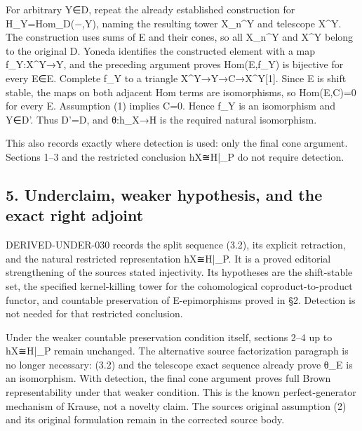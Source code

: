 For arbitrary Y\allowbreak{}∈D,\allowbreak{} repeat the already established construction for H\_\allowbreak{}Y\allowbreak{}=Hom\_\allowbreak{}D(−,\allowbreak{}Y)\allowbreak{},\allowbreak{} naming the resulting tower X\_\allowbreak{}n\textasciicircum{}Y and telescope X\^{}Y. The construction uses sums of E and their cones,\allowbreak{} so all X\_\allowbreak{}n\textasciicircum{}Y and X\^{}Y belong to the original D\textquotesingle. Yoneda identifies the constructed element with a map f\_\allowbreak{}Y:\allowbreak{}X\textasciicircum{}Y\allowbreak{}→Y,\allowbreak{} and the preceding argument proves Hom(E,\allowbreak{}f\_\allowbreak{}Y)\allowbreak{} is bijective for every E\allowbreak{}∈E. Complete f\_\allowbreak{}Y to a triangle X\textasciicircum{}Y\allowbreak{}→Y\allowbreak{}→C\allowbreak{}→X\textasciicircum{}Y[1]\allowbreak{}. Since E is shift stable,\allowbreak{} the maps on both adjacent Hom terms are isomorphisms,\allowbreak{} so Hom(E,\allowbreak{}C)\allowbreak{}\allowbreak{}=0 for every E. Assumption (1)\allowbreak{} implies C\allowbreak{}=0. Hence f\_\allowbreak{}Y is an isomorphism and Y\allowbreak{}∈D'. Thus D'\allowbreak{}=D,\allowbreak{} and θ:\allowbreak{}h\_\allowbreak{}X\allowbreak{}→H is the required natural isomorphism.

This also records exactly where detection is used:\allowbreak{} only the final cone argument. Sections 1–\allowbreak{}3 and the restricted conclusion hX≅H|\_\allowbreak{}P do not require detection.

\subsection{\texorpdfstring{5. Underclaim,\allowbreak{} weaker hypothesis,\allowbreak{} and the exact right adjoint}{5.  weaker  and the exact right adjoint}}\label{proofs-11460-11655-underclaim-weaker-hypothesis-and-the-exact-right-adjoint}

DERIVED-UNDER-030 records the split sequence (3.2)\allowbreak{},\allowbreak{} its explicit retraction,\allowbreak{} and the natural restricted representation hX≅H|\_\allowbreak{}P. It is a proved editorial strengthening of the source\textquotesingle s stated injectivity. Its hypotheses are the shift-stable set,\allowbreak{} the specified kernel-killing tower for the cohomological coproduct-to-product functor,\allowbreak{} and countable preservation of E-epimorphisms proved in §2. Detection is not needed for that restricted conclusion.

Under the weaker countable preservation condition itself,\allowbreak{} sections 2–\allowbreak{}4 up to hX≅H|\_\allowbreak{}P remain unchanged. The alternative source factorization paragraph is no longer necessary:\allowbreak{} (3.2)\allowbreak{} and the telescope exact sequence already prove θ\_\allowbreak{}E is an isomorphism. With detection,\allowbreak{} the final cone argument proves full Brown representability under that weaker condition. This is the known perfect-generator mechanism of Krause,\allowbreak{} not a novelty claim. The source\textquotesingle s original assumption (2)\allowbreak{} and its original formulation remain in the corrected source body.

